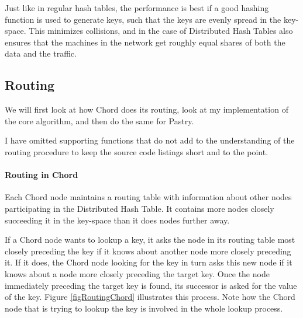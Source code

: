 Just like in regular hash tables, the performance is best if a good hashing function is used to generate keys, such that the keys are evenly spread in the key-space. This minimizes collisions, and in the case of Distributed Hash Tables also ensures that the machines in the network get roughly equal shares of both the data and the traffic.

\subsection{Routing}
We will first look at how Chord does its routing, look at my implementation of the core algorithm, and then do the same for Pastry.

I have omitted supporting functions that do not add to the understanding of the routing procedure to keep the source code listings short and to the point.


\paragraph{Routing in Chord}
Each Chord node maintains a routing table with information about other nodes participating in the Distributed Hash Table. It contains more nodes closely succeeding it in the key-space than it does nodes further away. 

If a Chord node wants to lookup a key, it asks the node in its routing table most closely preceding the key if it knows about another node more closely preceding it. If it does, the Chord node looking for the key in turn asks this new node if it knows about a node more closely preceding the target key. Once the node immediately preceding the target key is found, its successor is asked for the value of the key. Figure \ref{figRoutingChord} illustrates this process. Note how the Chord node that is trying to lookup the key is involved in the whole lookup process.

